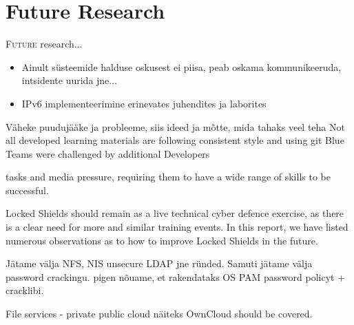 \chapter{Future Research}
\label{Future Research}

\lettrine[lraise=0.1, nindent=0em, slope=-.5em]{\color{Violet}F}{uture} research...


\begin{itemize}
\item Ainult süsteemide halduse oskusest ei piisa, peab oskama kommunikeeruda, intsidente uurida jne...
\item IPv6 implementeerimine erinevates juhendites ja laborites
\end{itemize}
{\color{red} Väheke puudujääke ja probleeme, siis ideed ja mõtte, mida tahaks veel teha
Not all developed learning materials are following consistent style and using \gls{git}
Blue Teams were challenged by additional Developers


tasks and media pressure, requiring them to have a wide range of skills to be successful. 


Locked Shields should remain as a live technical cyber defence exercise, as there is a clear need for
more and similar training events. In this report, we have listed numerous observations as to how to
improve Locked Shields in the future.

Jätame välja NFS, NIS unsecure LDAP jne ründed.
Samuti jätame välja password crackingu. pigen nõuame, et rakendataks OS PAM password policyt + cracklibi.
 }
 
 
File services  - private public cloud näiteks OwnCloud should be covered.
 
